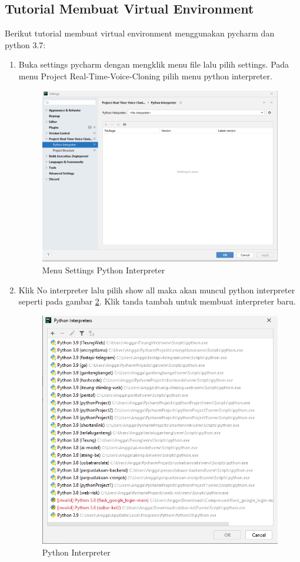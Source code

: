 \subsection{Tutorial Membuat Virtual Environment}
Berikut tutorial membuat virtual environment menggunakan pycharm dan python 3.7:
\begin{enumerate}

\item Buka settings pycharm dengan mengklik menu file lalu pilih settings. Pada menu Project Real-Time-Voice-Cloning pilih menu python interpreter.
\begin{figure}[H]
\centering
\includegraphics[scale=.4]{figures/env1}
\caption{Menu Settings Python Interpreter}
\label{env1}
\end{figure}

\item Klik No interpreter lalu pilih show all maka akan muncul python interpreter seperti pada gambar \ref{env2}. Klik tanda tambah untuk membuat interpreter baru.
\begin{figure}[H]
\centering
\includegraphics[scale=.4]{figures/env2}
\caption{Python Interpreter}
\label{env2}
\end{figure}


\end{enumerate}
